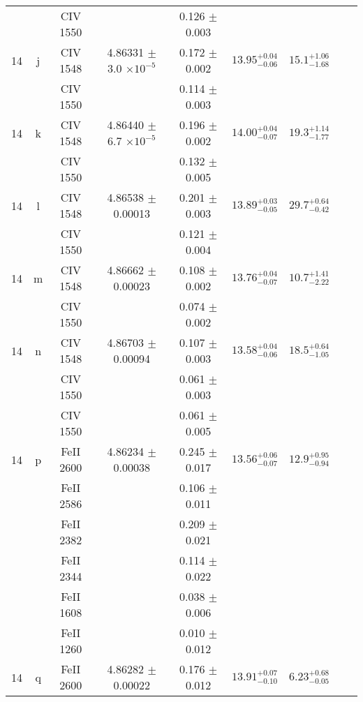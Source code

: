 \documentclass[12pt]{article}
\begin{document}
\begin{footnotesize}
\begin{longtable}{ c c c c c c c c c}
  &   & CIV     1550  &  &  0.126 $\pm$ 0.003   &   &     & 	 & \\ 
      14  & j  & CIV     1548  &  4.86331 $\pm$ 3.0 $\times 10^{-5}$   &  0.172 $\pm$ 0.002   & $13.95_{ - 0.06}^{ + 0.04}$  & $15.1_{ - 1.68}^{ + 1.06}$    & 	 & \\ 
  &   & CIV     1550  &  &  0.114 $\pm$ 0.003   &   &     & 	 & \\ 
      14  & k  & CIV     1548  &  4.86440 $\pm$ 6.7 $\times 10^{-5}$   &  0.196 $\pm$ 0.002   & $14.00_{ - 0.07}^{ + 0.04}$  & $19.3_{ - 1.77}^{ + 1.14}$    & 	 & \\ 
  &   & CIV     1550  &  &  0.132 $\pm$ 0.005   &   &     & 	 & \\ 
      14  & l  & CIV     1548  &  4.86538 $\pm$ 0.00013  &  0.201 $\pm$ 0.003   & $13.89_{ - 0.05}^{ + 0.03}$  & $29.7_{ - 0.42}^{ + 0.64}$    & 	 & \\ 
  &   & CIV     1550  &  &  0.121 $\pm$ 0.004   &   &     & 	 & \\ 
      14  & m  & CIV     1548  &  4.86662 $\pm$ 0.00023  &  0.108 $\pm$ 0.002   & $13.76_{ - 0.07}^{ + 0.04}$  & $10.7_{ - 2.22}^{ + 1.41}$    & 	 & \\ 
  &   & CIV     1550  &  &  0.074 $\pm$ 0.002   &   &     & 	 & \\ 
      14  & n  & CIV     1548  &  4.86703 $\pm$ 0.00094  &  0.107 $\pm$ 0.003   & $13.58_{ - 0.06}^{ + 0.04}$  & $18.5_{ - 1.05}^{ + 0.64}$    & 	 & \\ 
  &   & CIV     1550  &  &  0.061 $\pm$ 0.003   &   &     & 	 & \\ 
  &   & CIV     1550  &  &  0.061 $\pm$ 0.005   &   &     & 	 & \\ 
      14  & p  & FeII     2600  &  4.86234 $\pm$ 0.00038  &  0.245 $\pm$ 0.017   & $13.56_{ - 0.07}^{ + 0.06}$  & $12.9_{ - 0.94}^{ + 0.95}$    & 	 & \\ 
  &   & FeII     2586  &  &  0.106 $\pm$ 0.011   &   &     & 	 & \\ 
  &   & FeII     2382  &  &  0.209 $\pm$ 0.021   &   &     & 	 & \\ 
  &   & FeII     2344  &  &  0.114 $\pm$ 0.022   &   &     & 	 & \\ 
  &   & FeII     1608  &  &  0.038 $\pm$ 0.006   &   &     & 	 & \\ 
  &   & FeII     1260  &  &  0.010 $\pm$ 0.012   &   &     & 	 & \\ 
      14  & q  & FeII     2600  &  4.86282 $\pm$ 0.00022  &  0.176 $\pm$ 0.012   & $13.91_{ - 0.10}^{ + 0.07}$  & $6.23_{ - 0.05}^{ + 0.68}$    & 	 & \\ 

\end{longtable}
\end{footnotesize}
\end{document}
